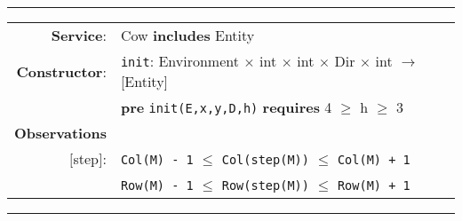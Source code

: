 \documentclass{article}
\begin{document}
\vspace{5mm}\hrule\vspace{5mm}

\begin{tabular}{rl}
\textbf{Service}: & Cow \textbf{includes} Entity \\
\textbf{Constructor}: & \texttt{init}: \textrm{Environment} $\times$ \textrm{int} $\times$ \textrm{int} $\times$ \textrm{Dir} $\times$ \textrm{int} $\rightarrow$ \textrm{[Entity]} \\
& \quad\quad\quad\quad\textbf{pre} \texttt{init(E,x,y,D,h)} \textbf{requires} 4 $\geq$ h $\geq$ 3 \\
\textbf{Observations} & \\
$[$step$]$: & \texttt{Col(M) - 1} $\leq$ \texttt{Col(step(M))} $\leq$ \texttt{Col(M) + 1} \\
& \texttt{Row(M) - 1} $\leq$ \texttt{Row(step(M))} $\leq$ \texttt{Row(M) + 1} \\
\end{tabular}

\vspace{5mm}\hrule\vspace{5mm}
\end{document}

